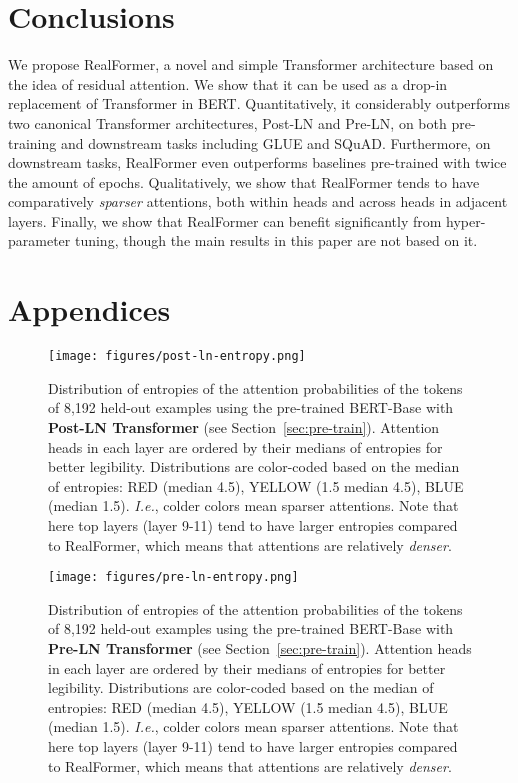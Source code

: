 \documentclass[11pt,a4paper]{article}
\begin{document}
\section{Conclusions}
We propose RealFormer, a novel and simple Transformer architecture based on the idea of residual attention.
We show that it can be used as a drop-in replacement of Transformer in BERT.
Quantitatively, it considerably outperforms two canonical Transformer architectures, Post-LN and Pre-LN, on both pre-training and downstream tasks including GLUE and SQuAD. Furthermore, on downstream tasks, RealFormer even outperforms baselines pre-trained with twice the amount of epochs. 
Qualitatively, we show that RealFormer tends to have comparatively \emph{sparser} attentions, both within heads and across heads in adjacent layers. 
Finally, we show that RealFormer can benefit significantly from hyper-parameter tuning, though the main results in this paper are not based on it.






\appendix

\section{Appendices}
\label{sec:appendix}
\begin{figure*}[!t]
\centering
\texttt{[image: figures/post-ln-entropy.png]}
\caption{Distribution of entropies of the attention probabilities of the tokens of 8,192 held-out examples using the pre-trained BERT-Base with \textbf{Post-LN Transformer} (see Section~\ref{sec:pre-train}). Attention heads in each layer are ordered by their medians of entropies for better legibility. Distributions are color-coded based on the median of entropies: RED (median  4.5), YELLOW (1.5  median  4.5), BLUE (median  1.5). \emph{I.e.}, colder colors mean sparser attentions. Note that here top layers (layer 9-11) tend to have larger entropies compared to RealFormer, which means that attentions are relatively \emph{denser}.}
\label{fig:post-ln-entropy}
\end{figure*}

\begin{figure*}[!t]
\centering
\texttt{[image: figures/pre-ln-entropy.png]}
\caption{Distribution of entropies of the attention probabilities of the tokens of 8,192 held-out examples using the pre-trained BERT-Base with \textbf{Pre-LN Transformer} (see Section~\ref{sec:pre-train}). Attention heads in each layer are ordered by their medians of entropies for better legibility. Distributions are color-coded based on the median of entropies: RED (median  4.5), YELLOW (1.5  median  4.5), BLUE (median  1.5). \emph{I.e.}, colder colors mean sparser attentions. Note that here top layers (layer 9-11) tend to have larger entropies compared to RealFormer, which means that attentions are relatively \emph{denser}.}
\label{fig:pre-ln-entropy}
\end{figure*}
\end{document}
